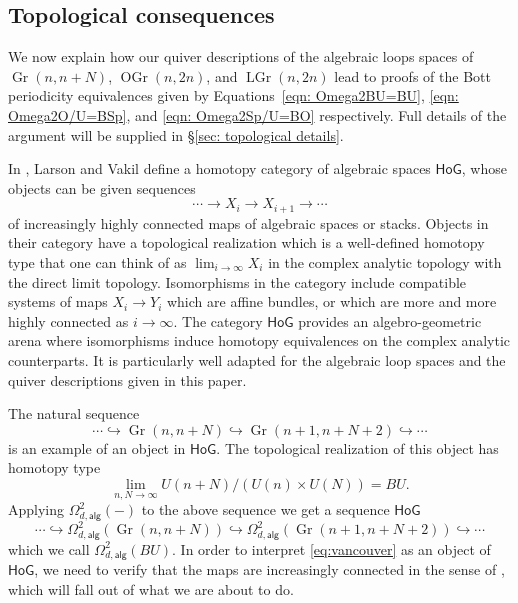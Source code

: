 \documentclass{amsart}
\theoremstyle{definition}
\newcommand{\HoG}{\textsf{HoG}}
\newcommand{\alg}{\mathsf{alg}}
\newcommand{\Gr}{\operatorname{Gr}}
\newcommand{\LGr}{\operatorname{LGr}}
\newcommand{\OGr}{\operatorname{OGr}}
\newcommand{\LoopTwo}{\Omega^{2}_{d,\alg}}
\begin{document}
\subsection{Topological consequences}\label{subsec: topological consequences}

We now explain how our quiver descriptions of the algebraic loops
spaces of  $\Gr (n,n+N)$, $\OGr(n,2n)$, and $\LGr(n,2n)$
lead to proofs of the Bott periodicity equivalences given by
Equations~\eqref{eqn: Omega2BU=BU}, \eqref{eqn: Omega2O/U=BSp}, and
\eqref{eqn: Omega2Sp/U=BO} respectively. Full details of the argument
will be supplied in \S \ref{sec: topological details}. 

In \cite{Larson-Vakil-BottPeriodicity}, Larson and Vakil define a
homotopy category of algebraic spaces $\HoG $, whose objects can be
given sequences
\[
\dotsb \to  X_{i} \to  X_{i+1}\to \dotsb 
\]
of increasingly highly connected maps of algebraic spaces or stacks. Objects in
their category have a topological realization which is a well-defined
homotopy type that one can think of as $\lim_{i\to \infty} X_{i}$ in
the complex analytic topology with the direct limit
topology. Isomorphisms in the category include compatible systems of
maps $X_{i} \to Y_{i}$ which are affine bundles, or which are more and
more highly connected as $i\to \infty$. The category $\HoG$ provides
an algebro-geometric arena where isomorphisms induce homotopy
equivalences on the complex analytic counterparts. It is particularly
well adapted for the algebraic loop spaces and the quiver descriptions
given in this paper.

The natural sequence
\[
\dotsb \hookrightarrow \Gr (n,n+N)\hookrightarrow \Gr
(n+1,n+N+2)\hookrightarrow \dotsb
\]
is an example of an object in $\HoG$. The topological realization of
this object has homotopy type
\[
\lim_{n,N\to \infty} U(n+N)/(U(n)\times U(N)) = BU.
\]
Applying $\LoopTwo (-)$ to the above sequence we get a sequence
$\HoG$ 
\begin{equation}\label{eq:vancouver}
\dotsb \hookrightarrow \LoopTwo (\Gr (n,n+N))\hookrightarrow \LoopTwo (\Gr (n+1,n+N+2))\hookrightarrow \dotsb 
\end{equation}
which we call $\LoopTwo (BU)$.  In order to interpret \eqref{eq:vancouver} as an object of $\HoG$, we need to verify that the maps are increasingly connected in the sense of \cite{Larson-Vakil-BottPeriodicity}, which will fall out of what we are about to do.
\end{document}
